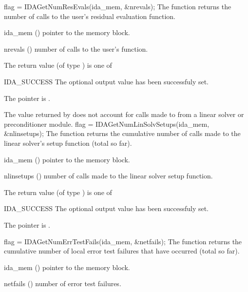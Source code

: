 {
  flag = IDAGetNumResEvals(ida\_mem, \&nrevals);
}
{
  The function  returns the 
  number of calls to the user's residual evaluation function.
}
{
  \begin{args}
  \item[ida\_mem] ()
    pointer to the {\ida} memory block.
  \item[nrevals] ()
    number of calls to the user's  function.
  \end{args}
}
{
  The return value  (of type ) is one of
  \begin{args}
  \item[IDA\_SUCCESS] 
    The optional output value has been successfuly set.
  \item[\Id{IDA\_MEM\_NULL}]
    The  pointer is .
  \end{args}
}
{
  The  value returned by  does not
  account for calls made to  from a linear solver or preconditioner 
  module. 
}
{
  flag = IDAGetNumLinSolvSetups(ida\_mem, \&nlinsetups);
}
{
  The function  returns the
  cumulative number of calls made to the linear solver's setup function 
  (total so far).
}
{
  \begin{args}[nlinsetups]
  \item[ida\_mem] ()
    pointer to the {\ida} memory block.
  \item[nlinsetups] ()
    number of calls made to the linear solver setup function.
  \end{args}
}
{
  The return value  (of type ) is one of
  \begin{args}
  \item[IDA\_SUCCESS] 
    The optional output value has been successfuly set.
  \item[\Id{IDA\_MEM\_NULL}]
    The  pointer is .
  \end{args}
}
{}
{
  flag = IDAGetNumErrTestFails(ida\_mem, \&netfails);
}
{
  The function  returns the
  cumulative number of local error test failures that have occurred 
  (total so far).
}
{
  \begin{args}[netfails]
  \item[ida\_mem] ()
    pointer to the {\ida} memory block.
  \item[netfails] ()
    number of error test failures.
  \end{args}
}
